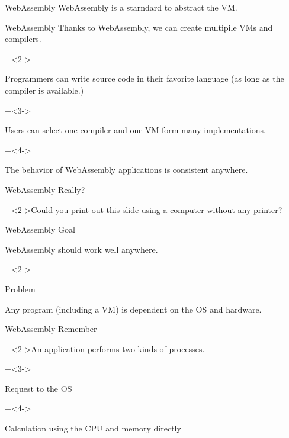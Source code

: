 \begin{frame}{WebAssembly}{}
    {\Large WebAssembly is a starndard to abstract the VM.}
\end{frame}


\begin{frame}{WebAssembly}{}
    Thanks to WebAssembly, we can create multipile VMs and compilers.
    \vspace{4ex}

    \begin{itemize}
        \onslide+<2->{\item Programmers can write source code in their favorite language (as long as the compiler is available.)}
        \onslide+<3->{\item Users can select one compiler and one VM form many implementations.}
        \onslide+<4->{\item The behavior of WebAssembly applications is consistent anywhere.}
    \end{itemize}
\end{frame}


\begin{frame}{WebAssembly}{}
    {\Huge Really?}
    \vspace{4ex}

    \onslide+<2->{Could you print out this slide using a computer without any printer?}
\end{frame}


\begin{frame}{WebAssembly}{}
    Goal
    \vspace{2ex}

    WebAssembly should work well anywhere.
    \vspace{4ex}

    \onslide+<2->{
        Problem
        \vspace{2ex}

        Any program (including a VM) is dependent on the OS and hardware.
    }
\end{frame}


\begin{frame}{WebAssembly}{}
    Remember
    \vspace{2ex}

    \onslide+<2->{An application performs two kinds of processes.}
    \vspace{4ex}

    \begin{itemize}
        \onslide+<3->{\item Request to the OS}
        \onslide+<4->{\item Calculation using the CPU and memory directly}
    \end{itemize}
\end{frame}


